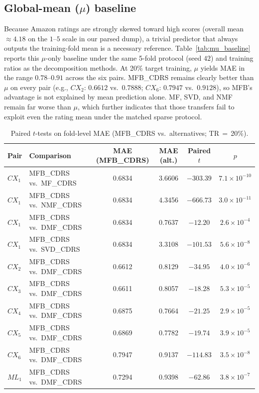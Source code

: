 \documentclass[pdflatex,sn-mathphys-num]{sn-jnl}%
\theoremstyle{thmstyleone}%
\theoremstyle{thmstyletwo}%
\theoremstyle{thmstylethree}%
\begin{document}
\subsection{Global-mean ($\mu$) baseline}
Because Amazon ratings are strongly skewed toward high scores (overall mean $\approx 4.18$ on the $1$--$5$ scale in our parsed dump), a trivial predictor that always outputs the training-fold mean is a necessary reference. Table~\ref{tab:mu_baseline} reports this $\mu$-only baseline under the same 5-fold protocol (seed $42$) and training ratios as the decomposition methods. At 20\% target training, $\mu$ yields MAE in the range $0.78$--$0.91$ across the six pairs. MFB\_CDRS remains clearly better than $\mu$ on every pair (e.g., $CX_2$: $0.6612$ vs.\ $0.7888$; $CX_6$: $0.7947$ vs.\ $0.9128$), so MFB's advantage is not explained by mean prediction alone. MF, SVD, and NMF remain far worse than $\mu$, which further indicates that those transfers fail to exploit even the rating mean under the matched sparse protocol.

\begin{table}[!htbp]
\centering
\caption{Paired $t$-tests on fold-level MAE (MFB\_CDRS vs.\ alternatives; TR\,$=$\,20\%).}
\label{tab:sig_all}
\renewcommand{\arraystretch}{1.12}
\small
\begin{tabularx}{\textwidth}{l >{\raggedright\arraybackslash}X cccc}
\toprule
\textbf{Pair} & \textbf{Comparison} & \textbf{MAE (MFB\_CDRS)} & \textbf{MAE (alt.)} & \textbf{Paired $t$} & \textbf{$p$} \\
\midrule
$CX_1$ & MFB\_CDRS vs.\ MF\_CDRS & 0.6834 & 3.6606 & $-303.39$ & $7.1\times 10^{-10}$ \\
$CX_1$ & MFB\_CDRS vs.\ NMF\_CDRS & 0.6834 & 4.3456 & $-666.73$ & $3.0\times 10^{-11}$ \\
$CX_1$ & MFB\_CDRS vs.\ DMF\_CDRS & 0.6834 & 0.7637 & $-12.20$ & $2.6\times 10^{-4}$ \\
$CX_1$ & MFB\_CDRS vs.\ SVD\_CDRS & 0.6834 & 3.3108 & $-101.53$ & $5.6\times 10^{-8}$ \\
\midrule
$CX_2$ & MFB\_CDRS vs.\ DMF\_CDRS & 0.6612 & 0.8129 & $-34.95$ & $4.0\times 10^{-6}$ \\
$CX_3$ & MFB\_CDRS vs.\ DMF\_CDRS & 0.6611 & 0.8057 & $-18.28$ & $5.3\times 10^{-5}$ \\
$CX_4$ & MFB\_CDRS vs.\ DMF\_CDRS & 0.6875 & 0.7664 & $-21.25$ & $2.9\times 10^{-5}$ \\
$CX_5$ & MFB\_CDRS vs.\ DMF\_CDRS & 0.6869 & 0.7782 & $-19.74$ & $3.9\times 10^{-5}$ \\
$CX_6$ & MFB\_CDRS vs.\ DMF\_CDRS & 0.7947 & 0.9137 & $-114.83$ & $3.5\times 10^{-8}$ \\
$ML_1$ & MFB\_CDRS vs.\ DMF\_CDRS & 0.7294 & 0.9398 & $-62.86$ & $3.8\times 10^{-7}$ \\
\bottomrule
\end{tabularx}
\end{table}
\end{document}
